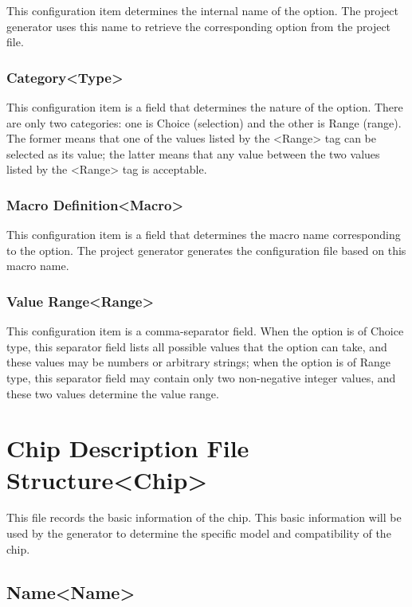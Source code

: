 This configuration item determines the internal name of the option. The project generator uses this name to retrieve the corresponding option from the project file.

\subsubsection{Category<Type>{}}\label{subsubsec:5-4-8-2}

This configuration item is a field that determines the nature of the option. There are only two categories: one is Choice (selection) and the other is Range (range). The former means that one of the values listed by the <Range> tag can be selected as its value; the latter means that any value between the two values listed by the <Range> tag is acceptable.

\subsubsection{Macro Definition<Macro>{}}\label{subsubsec:5-4-8-3}

This configuration item is a field that determines the macro name corresponding to the option. The project generator generates the configuration file based on this macro name.

\subsubsection{Value Range<Range>{}}\label{subsubsec:5-4-8-4}

This configuration item is a comma-separator field. When the option is of Choice type, this separator field lists all possible values that the option can take, and these values may be numbers or arbitrary strings; when the option is of Range type, this separator field may contain only two non-negative integer values, and these two values determine the value range.


\section{Chip Description File Structure<Chip>{}}\label{sec:5-5}

This file records the basic information of the chip. This basic information will be used by the generator to determine the specific model and compatibility of the chip.

\subsection{Name<Name>{}}\label{subsec:5-5-1}

